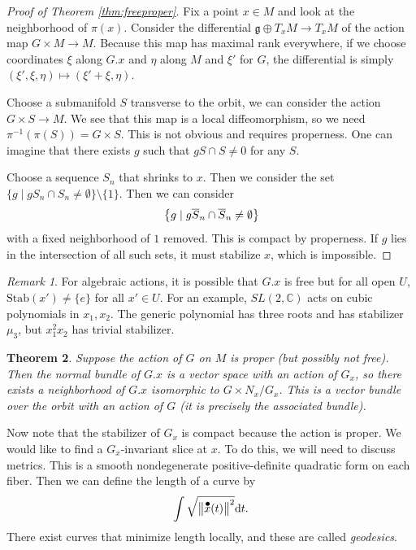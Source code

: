 \documentclass[leqno, openany]{memoir}
\newtheorem{thm}{Theorem}[section]
\theoremstyle{definition}
\theoremstyle{remark}
\newtheorem{rmk}[thm]{Remark}
\theoremstyle{plain}
\theoremstyle{definition}
\theoremstyle{remark}
\newcommand{\C}{\mathbb{C}}
\newcommand*{\dt}[1]{%
   \accentset{\mbox{\Huge\bfseries .}}{#1}}
\newcommand{\mf}[1]{\mathfrak{#1}}
\newcommand{\mr}[1]{\mathrm{#1}}
\newcommand{\ol}[1]{\overline{#1}}
\begin{document}
\begin{proof}[Proof of Theorem \ref{thm:freeproper}] Fix a point $x \in M$ and
    look at the neighborhood of $\pi(x)$. Consider the differential $\mf{g}
    \oplus T_x M \to T_x M$ of the action map $G \times M \to M$. Because this
    map has maximal rank everywhere, if we choose coordinates $\xi$ along $G.x$
    and $\eta$ along $M$ and $\xi'$ for $G$, the differential is simply
    $(\xi',\xi,\eta) \mapsto (\xi'+\xi, \eta)$.

    Choose a submanifold $S$ transverse to the orbit, we can consider the
    action $G \times S \to M$. We see that this map is a local diffeomorphism,
    so we need $\pi^{-1}(\pi(S)) = G \times S$. This is not obvious and
    requires properness. One can imagine that there exists $g$ such that $gS
    \cap S \neq 0$ for any $S$. 

    Choose a sequence $S_n$ that shrinks to $x$. Then we consider the set $\{ g
    \mid g S_n \cap S_n \neq \emptyset \} \setminus \{1 \}$. Then we can
    consider \[ \qty{ g \mid g \ol{S}_n \cap \ol{S}_n \neq \emptyset } \] with
    a fixed neighborhood of $1$ removed. This is compact by properness. If $g$
    lies in the intersection of all such sets, it must stabilize $x$, which is
    impossible.  \end{proof}

\begin{rmk} For algebraic actions, it is possible that $G.x$ is free but for
    all open $U$, $\mr{Stab}(x') \neq \{ e \}$ for all $x' \in U$. For an
    example, $SL(2,\C)$ acts on cubic polynomials in $x_1,x_2$. The generic
    polynomial has three roots and has stabilizer $\mu_3$, but $x_1^2 x_2$ has
    trivial stabilizer.  \end{rmk}

\begin{thm} Suppose the action of $G$ on $M$ is proper (but possibly not free).
    Then the normal bundle of $G.x$ is a vector space with an action of $G_x$,
    so there exists a neighborhood of $G.x$ isomorphic to $G \times N_x / G_x$.
    This is a vector bundle over the orbit with an action of $G$ (it is
    precisely the associated bundle).  \end{thm}

Now note that the stabilizer of $G_x$ is compact because the action is proper.
We would like to find a $G_x$-invariant slice at $x$. To do this, we will need
to discuss metrics. This is a smooth nondegenerate positive-definite quadratic
form on each fiber. Then we can define the length of a curve by \[ \int
\sqrt{\norm{\dt{x}(t)}^2} \dd t. \] There exist curves that minimize length
locally, and these are called \textit{geodesics}. 
\end{document}
